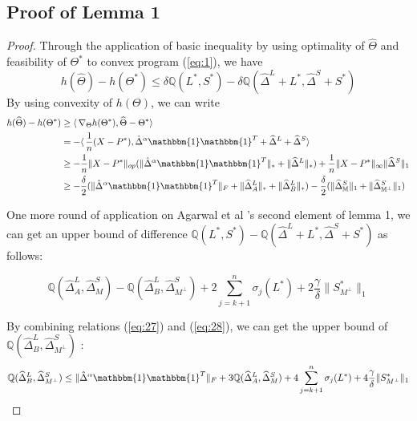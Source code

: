 \documentclass[AMS,STIX1COL]{WileyNJD-v2}
\begin{document}
\subsection{Proof of Lemma 1}
\begin{proof}
Through the application of basic inequality by using optimality of $\widehat{\Theta}$ and feasibility of $\Theta^{*}$ to convex program (\ref{eq:1}), we have
\begin{equation}
    h(\widehat{\Theta}) - h(\Theta^{*})
    \leq \delta \mathbb{Q}(L^{*},S^{*}) - \delta \mathbb{Q}(\widehat{\Delta}^L + L^{*},\widehat{\Delta}^S + S^{*})
\end{equation}
By using convexity of $h(\Theta)$, we can write
\begin{align}
    h(\widehat{\Theta})-h(\Theta^{*}) &\geq 
    \langle\, \nabla_{\Theta}h(\Theta^{*}),\widehat{\Theta}-\Theta^{*}\rangle\ \nonumber \\
    &= - \langle\,\frac{1}{n} (X-P^{*}), \hat{\Delta}^{\alpha}\mathbbm{1}\mathbbm{1}^T + \widehat{\Delta}^{L} + \widehat{\Delta}^{S} \rangle\ \nonumber \\
    &\geq -\frac{1}{n} \|X - P^*\|_{op}(\|\hat{\Delta}^{\alpha}\mathbbm{1}\mathbbm{1}^T\|_\ast + \|\widehat{\Delta}^{L}\|_\ast) +  \frac{1}{n} \|X - P^*\|_{\infty}\|\widehat{\Delta}^{S}\|_{1} \nonumber \\ 
    &\geq -\frac{\delta}{2}(\|\hat{\Delta}^{\alpha}\mathbbm{1}\mathbbm{1}^T\|_F + \|\widehat{\Delta}^{L}_{A}\|_\ast + \|\widehat{\Delta}^{L}_{B}\|_\ast) - \frac{\delta}{2} (\|\widehat{\Delta}^{S}_{\mathbb{M}}\|_{1} + 
    \|\widehat{\Delta}^{S}_{\mathbb{M^\perp}}\|_{1}) \label{eq:27}
\end{align}

One more round of application on Agarwal et al \cite{agarwal2012noisy}'s second element of lemma 1, 
we can get an upper bound of difference $\mathbb{Q}(L^*,S^*)- \mathbb{Q}(\widehat{\Delta}^L + L^{*},\widehat{\Delta}^S + S^{*})$ as follows:  

\begin{equation} \label{eq:28}
    \mathbb{Q}(\widehat{\Delta}^L_{A},\widehat{\Delta}^S_{M}) - \mathbb{Q}(\widehat{\Delta}^L_{B},\widehat{\Delta}^S_{M^\perp})
    +2 \sum_{j=k+1}^{n} \sigma_{j}(L^*) + 2\frac{\gamma}{\delta}\|S^*_{M^\perp}\|_{1}
\end{equation}

By combining relations (\ref{eq:27}) and (\ref{eq:28}), we can get the upper bound of $\mathbb{Q}(\widehat{\Delta}^L_{B},\widehat{\Delta}^S_{M^\perp})$ : 
\begin{align*}
    \mathbb{Q}(\widehat{\Delta}^L_{B},\widehat{\Delta}^S_{M^\perp}) \leq 
    \|\hat{\Delta}^{\alpha}\mathbbm{1}\mathbbm{1}^T\|_{F} + 
    3\mathbb{Q}(\widehat{\Delta}^{L}_{A},\widehat{\Delta}^{S}_{M})+4 \sum_{j=k+1}^{n} \sigma_{j}(L^{*}) + 4\frac{\gamma}{\delta}   
    \|S^{*}_{M^\perp}\|_{1}
\end{align*}



\end{proof}
\end{document}
